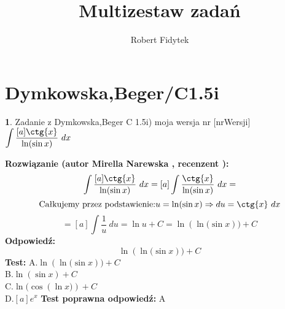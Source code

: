 \documentclass[12pt, a4paper]{article}
\title{Multizestaw zadań}
\author{Robert Fidytek}
\date{}
\theoremstyle{definition} %
\newtheorem{zad}{}
\newcommand{\kategoria}[1]{\section{#1}} %
\newcommand{\zadStart}[1]{\begin{zad}#1\newline} %
\newcommand{\zadStop}{\end{zad}}   %
\newcommand{\rozwStart}[2]{\noindent \textbf{Rozwiązanie (autor #1 , recenzent #2): }\newline} %
\newcommand{\odpStart}{\noindent \textbf{Odpowiedź:}\newline}    %
\newcommand{\odpStop}{\newline}                                             %
\newcommand{\testStart}{\noindent \textbf{Test:}\newline} %
\newcommand{\testStop}{\newline} %
\newcommand{\kluczStart}{\noindent \textbf{Test poprawna odpowiedź:}\newline} %
\newcommand{\kluczStop}{\newline} %
\begin{document}
\maketitle



\kategoria{Dymkowska,Beger/C1.5i}
\zadStart{Zadanie z Dymkowska,Beger C 1.5i) moja wersja nr [nrWersji]}
 $\displaystyle \int \frac{[a]\ctg{x}}{\ln({\sin{x})}} \ dx$
\zadStop
\rozwStart{Mirella Narewska}{}
$$\int \frac{[a]\ctg{x}}{\ln({\sin{x})}} \ dx =[a]\int \frac{\ctg{x}}{\ln({\sin{x})}} \ dx=$$
$$\text{Całkujemy przez podstawienie:} u=\ln({\sin{x}})\Rightarrow du=\ctg{x}  \ dx$$
$$=[a]\int \frac{1}{u} \ du=\ln{u}+C=\ln({\ln({\sin{x}}}))+C$$
\odpStart
$$\ln({\ln({\sin{x}}}))+C$$
\odpStop
\testStart
A.$\ln({\ln({\sin{x}}}))+C$
\\
B.$\ln(\sin{x})+C$
\\
C.$\ln({\cos({\ln{x})})}+C$
\\
D.$[a]e^{x}$
\testStop
\kluczStart
A
\kluczStop
\end{document}
